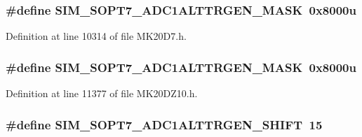 \subsubsection[{\texorpdfstring{S\+I\+M\+\_\+\+S\+O\+P\+T7\+\_\+\+A\+D\+C1\+A\+L\+T\+T\+R\+G\+E\+N\+\_\+\+M\+A\+SK}{SIM_SOPT7_ADC1ALTTRGEN_MASK}}]{\setlength{\rightskip}{0pt plus 5cm}\#define S\+I\+M\+\_\+\+S\+O\+P\+T7\+\_\+\+A\+D\+C1\+A\+L\+T\+T\+R\+G\+E\+N\+\_\+\+M\+A\+SK~0x8000u}\hypertarget{group___s_i_m___register___masks_ga784f68293064986f91f7a6221a67ed14}{}\label{group___s_i_m___register___masks_ga784f68293064986f91f7a6221a67ed14}


Definition at line 10314 of file M\+K20\+D7.\+h.

\subsubsection[{\texorpdfstring{S\+I\+M\+\_\+\+S\+O\+P\+T7\+\_\+\+A\+D\+C1\+A\+L\+T\+T\+R\+G\+E\+N\+\_\+\+M\+A\+SK}{SIM_SOPT7_ADC1ALTTRGEN_MASK}}]{\setlength{\rightskip}{0pt plus 5cm}\#define S\+I\+M\+\_\+\+S\+O\+P\+T7\+\_\+\+A\+D\+C1\+A\+L\+T\+T\+R\+G\+E\+N\+\_\+\+M\+A\+SK~0x8000u}\hypertarget{group___s_i_m___register___masks_ga784f68293064986f91f7a6221a67ed14}{}\label{group___s_i_m___register___masks_ga784f68293064986f91f7a6221a67ed14}


Definition at line 11377 of file M\+K20\+D\+Z10.\+h.

\subsubsection[{\texorpdfstring{S\+I\+M\+\_\+\+S\+O\+P\+T7\+\_\+\+A\+D\+C1\+A\+L\+T\+T\+R\+G\+E\+N\+\_\+\+S\+H\+I\+FT}{SIM_SOPT7_ADC1ALTTRGEN_SHIFT}}]{\setlength{\rightskip}{0pt plus 5cm}\#define S\+I\+M\+\_\+\+S\+O\+P\+T7\+\_\+\+A\+D\+C1\+A\+L\+T\+T\+R\+G\+E\+N\+\_\+\+S\+H\+I\+FT~15}\hypertarget{group___s_i_m___register___masks_gab364156b2cb9b83329803bdc8c0c589e}{}\label{group___s_i_m___register___masks_gab364156b2cb9b83329803bdc8c0c589e}


